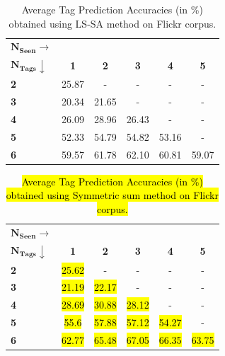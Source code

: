 \begin{table}[!htb]
\fontsize{8pt}{1em}\selectfont
\begin{center}
\caption{Average Tag Prediction Accuracies (in \%) obtained using LS-SA method on Flickr corpus.}
\label{tab:TPFlickr117LSSA}
\begin{tabular}{|p{2cm}|c|c|c|c|c|}
		\hline
		{$\boldsymbol{N_{Seen} \rightarrow}$} & &  &  &  &\\ 
		{$\boldsymbol{N_{Tags}}\downarrow $} & \textbf{1} & \textbf{2} & \textbf{3} & \textbf{4} & \textbf{5}   \\ 
		\hline 		
		\textbf{2} & 25.87 & - & - & - & -\\ 
		\hline
		\textbf{3} & 20.34 & 21.65 & - & - & -\\ 
		\hline
		\textbf{4} & 26.09 & 28.96 & 26.43 & - & -\\ 
		\hline
		\textbf{5} & 52.33 & 54.79 & 54.82 & 53.16 & -\\ 
		\hline
		\textbf{6} & 59.57 & 61.78 & 62.10 & 60.81 & 59.07 \\ 
		\hline
\end{tabular}
\vspace{-2mm}
\end{center}
\end{table}
\begin{table}[!htb]
\fontsize{8pt}{1em}\selectfont
\begin{center}
\caption{\hl{Average Tag Prediction Accuracies (in \%) obtained using Symmetric sum method on Flickr corpus.}}
\label{tab:TPFlickr117Jij}
\begin{tabular}{|p{2cm}|c|c|c|c|c|}
		\hline
		{$\boldsymbol{N_{Seen} \rightarrow}$} & &  &  &  &\\ 
		{$\boldsymbol{N_{Tags}}\downarrow $} & \textbf{1} & \textbf{2} & \textbf{3} & \textbf{4} & \textbf{5}   \\ 
		\hline 		
		\textbf{2} &\hl{ 25.62} & - & - & - & -\\
		\hline
		\textbf{3} & \hl{21.19} & \hl{22.17} & - & - & - \\
		\hline
		\textbf{4} & \hl{28.69} & \hl{30.88} & \hl{28.12} & - & - \\
		\hline
		\textbf{5} & \hl{55.6} & \hl{57.88} & \hl{57.12} & \hl{54.27} & - \\
		\hline
		\textbf{6} & \hl{62.77} & \hl{65.48} & \hl{67.05} & \hl{66.35} & \hl{63.75} \\
		\hline
\end{tabular}
\vspace{-2mm}
\end{center}
\end{table}



